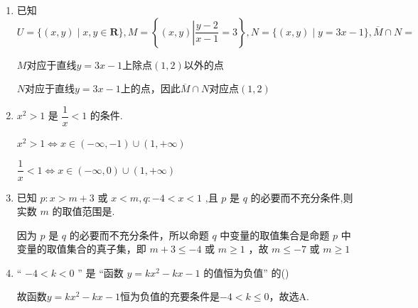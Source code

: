 \begin{enumerate}
    \item 已知 $U = \{ \left( {x,y}\right)  \mid  x,y \in  \mathbf{R}\} ,M = \left\{  {\left( {x,y}\right) \left| {\dfrac{y - 2}{x - 1} = 3}\right. }\right\}  ,N = \{ \left( {x,y}\right)  \mid  y = {3x} - 1\} ,\overline{M} \cap N =$ 
    \begin{jieda}
        $M$对应于直线$y = 3x-1$上除点$(1, 2)$以外的点

        $N$对应于直线$y = 3x-1$上的点，因此$\overline{M} \cap N$对应点$(1, 2)$
    \end{jieda}
    
    \item $x^2 > 1$ 是 $\dfrac{1}{x} < 1$ 的条件.
    \begin{jieda}
        $x^2 > 1 \Longleftrightarrow x \in (-\infty, -1) \cup (1, +\infty)$

        $\dfrac{1}{x} < 1 \Longleftrightarrow x \in (-\infty, 0) \cup (1, +\infty)$
    \end{jieda}
    
    \item 已知 $p : x > m + 3$ 或 $x < m,q :  - 4 < x < 1$ ,且 $p$ 是 $q$ 的必要而不充分条件,则实数 $m$ 的取值范围是.
    \begin{jieda}
        因为 $p$ 是 $q$ 的必要而不充分条件，所以命题 $q$ 中变量的取值集合是命题 $p$ 中变量的取值集合的真子集，即 $m + 3 \leq   - 4$ 或 $m \geq  1$ ，故 $m \leq   - 7$ 或 $m \geq  1$
    \end{jieda}
    
    \item “ $- 4 < k < 0$ ” 是 “函数 $y = k{x}^{2} - {kx} - 1$ 的值恒为负值” 的\dotfill()
    \begin{jieda}
        故函数$y = k{x}^{2} - {kx} - 1$恒为负值的充要条件是$- 4 < k \leq 0$，故选A.
    \end{jieda}


\end{enumerate}
